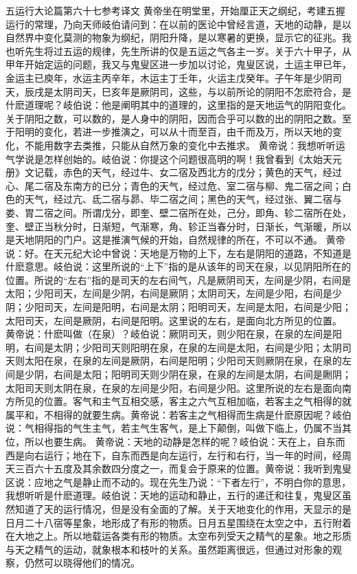 \documentclass[a4paper,12pt,UTF8,twoside]{ctexbook}
\begin{document}
五运行大论篇第六十七参考译文
黄帝坐在明堂里，开始厘正天之纲纪，考建五握运行的常理，乃向天师岐伯请问到：在以前的医论中曾经言道，天地的动静，是以自然界中变化莫测的物象为纲纪，阴阳升降，是以寒暑的更换，显示它的征兆。我也听先生将过五运的规律，先生所讲的仅是五运之气各主一岁。关于六十甲子，从甲年开始定运的问题，我又与鬼叟区进一步加以讨论，鬼叟区说，土运主甲已年，金运主已庾年，水运主丙辛年，木运主丁壬年，火运主戊癸年。子午年是少阴司天，辰戌是太阴司天，巳亥年是厥阴司，这些，与以前所论的阴阳不怎麽符合，是什麽道理呢？岐伯说：他是阐明其中的道理的，这里指的是天地运气的阴阳变化。关于阴阳之数，可以数的，是人身中的阴阳，因而合乎可以数的出的阴阳之数。至于阳明的变化，若进一步推演之，可以从十而至百，由千而及万，所以天地的变化，不能用数字去类推，只能从自然万象的变化中去推求。
黄帝说：我想听听运气学说是怎样创始的。岐伯说：你提这个问题很高明的啊！我曾看到《太始天元册》文记载，赤色的天气，经过牛、女二宿及西北方的戊分；黄色的天气，经过心、尾二宿及东南方的已分；青色的天气，经过危、室二宿与柳、鬼二宿之间；白色的天气，经过亢、氐二宿与昴、毕二宿之间；黑色的天气，经过张、翼二宿与娄、胃二宿之间。所谓戊分，即奎、壁二宿所在处，己分，即角、轸二宿所在处，奎、壁正当秋分时，日渐短，气渐寒，角、轸正当春分时，日渐长，气渐暖，所以是天地阴阳的门户。这是推演气候的开始，自然规律的所在，不可以不通。
黄帝说：好。在天元纪大论中曾说：天地是万物的上下，左右是阴阳的道路，不知道是什麽意思。岐伯说：这里所说的“上下”指的是从该年的司天在泉，以见阴阳所在的位置。所说的“左右”指的是司天的左右间气，凡是厥阴司天，左间是少阴，右间是太阳；少阳司天，左间是少阴，右间是厥阴；太阴司天，左间是少阳，右间是少阴；少阳司天，左间是阳明，右间是太阴；阳明司天，左间是太阳，右间是少阳；太阳司天，左间是厥阴，右间是阳明。这里说的左右，是面向北方所见的位置。
黄帝说：什麽叫做（在泉）？岐伯说：厥阴司天，则少阳在泉，在泉的左间是阳明，右间是太阴；少阳司天则阳明在泉，在泉的左间是太阳，右间是少阳；太阴司天则太阳在泉，在泉的左间是厥阴，右间是阳明；少阳司天则厥阴在泉，在泉的左间是少阴，右间是太阳；阳明司天则少阴在泉，在泉的左间是太阴，右间是劂阴；太阳司天则太阴在泉，在泉的左间是少阳，右间是少阳。这里所说的左右是面向南方所见的位置。客气和主气互相交感，客主之六气互相加临，若客主之气相得的就属平和，不相得的就要生病。黄帝说：若客主之气相得而生病是什麽原因呢？岐伯说：气相得指的气生主气，若主气生客气，是上下颠倒，叫做下临上，仍属不当其位，所以也要生病。
黄帝说：天地的动静是怎样的呢？岐伯说：天在上，自东而西是向右运行；地在下，自东而西是向左运行，左行和右行，当一年的时间，经周天三百六十五度及其余数四分度之一，而复会于原来的位置。黄帝说：我听到鬼叟区说：应地之气是静止而不动的。现在先生乃说：“下者左行”，不明白你的意思，我想听听是什麽道理。岐伯说：天地的运动和静止，五行的递迁和往复，鬼叟区虽然知道了天的运行情况，但是没有全面的了解。关于天地变化的作用，天显示的是日月二十八宿等星象，地形成了有形的物质。日月五星围绕在太空之中，五行附着在大地之上。所以地载运各类有形的物质。太空布列受天之精气的星象。地之形质与天之精气的运动，就象根本和枝叶的关系。虽然距离很远，但通过对形象的观察，仍然可以晓得他们的情况。
\end{document}
